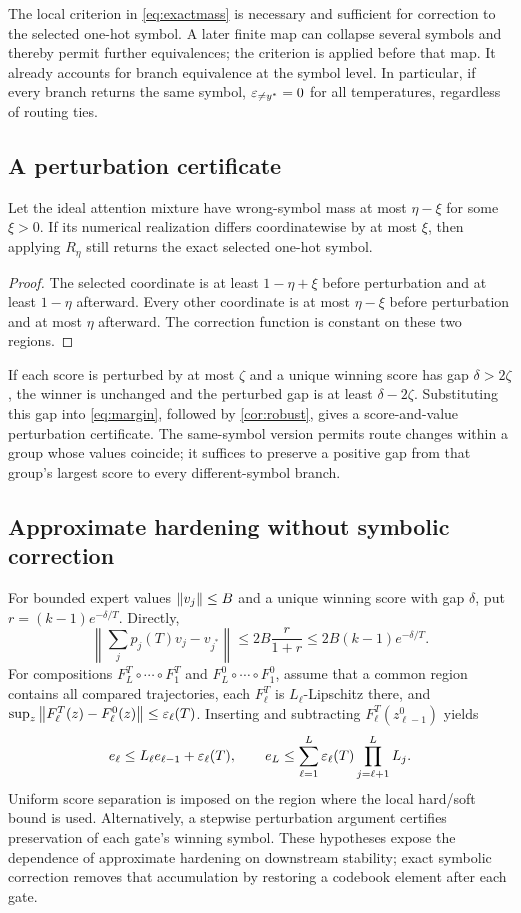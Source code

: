 The local criterion in \eqref{eq:exactmass} is necessary and sufficient for correction to the selected one-hot symbol. A later finite map can collapse several symbols and thereby permit further equivalences; the criterion is applied before that map. It already accounts for branch equivalence at the symbol level. In particular, if every branch returns the same symbol, $\varepsilon_{\ne y^*}=0$ for all temperatures, regardless of routing ties.

\subsection{A perturbation certificate}
\begin{corollary}\label{cor:robust}
Let the ideal attention mixture have wrong-symbol mass at most $\eta-\xi$ for some $\xi>0$. If its numerical realization differs coordinatewise by at most $\xi$, then applying $R_\eta$ still returns the exact selected one-hot symbol.
\end{corollary}
\begin{proof}
The selected coordinate is at least $1-\eta+\xi$ before perturbation and at least $1-\eta$ afterward. Every other coordinate is at most $\eta-\xi$ before perturbation and at most $\eta$ afterward. The correction function is constant on these two regions.
\end{proof}
If each score is perturbed by at most $\zeta$ and a unique winning score has gap $\delta>2\zeta$, the winner is unchanged and the perturbed gap is at least $\delta-2\zeta$. Substituting this gap into \eqref{eq:margin}, followed by \cref{cor:robust}, gives a score-and-value perturbation certificate. The same-symbol version permits route changes within a group whose values coincide; it suffices to preserve a positive gap from that group's largest score to every different-symbol branch.

\subsection{Approximate hardening without symbolic correction}
For bounded expert values $\left\lVert v_j\right\rVert\le B$ and a unique winning score with gap $\delta$, put $r=(k-1)e^{-\delta/T}$. Directly,
\begin{equation}
 \left\|\sum_jp_j(T)v_j-v_{j^*}\right\|
 \le 2B\frac{r}{1+r}\le 2B(k-1)e^{-\delta/T}.
 \label{eq:approxhard}
\end{equation}
For compositions $F_L^T\circ\cdots\circ F_1^T$ and $F_L^0\circ\cdots\circ F_1^0$, assume that a common region contains all compared trajectories, each $F_\ell^T$ is $L_\ell$-Lipschitz there, and $\sup_z\left\lVert F_\ell^T(z)-F_\ell^0(z)\right\rVert\le\varepsilon_\ell(T)$. Inserting and subtracting $F_\ell^T(z_{\ell-1}^0)$ yields
\[
 e_\ell\le L_\ell e_{\ell-1}+\varepsilon_\ell(T),\qquad
 e_L\le\sum_{\ell=1}^L\varepsilon_\ell(T)\prod_{j=\ell+1}^LL_j.
\]
Uniform score separation is imposed on the region where the local hard/soft bound is used. Alternatively, a stepwise perturbation argument certifies preservation of each gate's winning symbol. These hypotheses expose the dependence of approximate hardening on downstream stability; exact symbolic correction removes that accumulation by restoring a codebook element after each gate.

